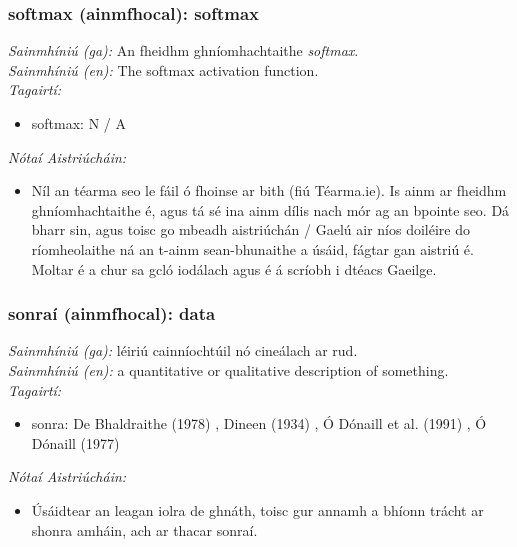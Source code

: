 \subsubsection*{softmax (ainmfhocal): softmax}
 \noindent \textit{Sainmhíniú (ga):} An fheidhm ghníomhachtaithe  \noindent \textit{softmax}.
\\
 \noindent \textit{Sainmhíniú (en):} The softmax activation function.
\\
 \noindent \textit{Tagairtí:}
\begin{itemize}
	\item softmax: N / A
\end{itemize}

 \noindent \textit{Nótaí Aistriúcháin:}
\begin{itemize}
	\item Níl an téarma seo le fáil ó fhoinse ar bith (fiú Téarma.ie). Is ainm ar fheidhm ghníomhachtaithe é, agus tá sé ina ainm dílis nach mór ag an bpointe seo. Dá bharr sin, agus toisc go mbeadh aistriúchán / Gaelú air níos doiléire do ríomheolaithe ná an t-ainm sean-bhunaithe a úsáid, fágtar gan aistriú é. Moltar é a chur sa gcló iodálach agus é á scríobh i dtéacs Gaeilge.
\end{itemize}


\subsubsection*{sonraí (ainmfhocal): data}
 \noindent \textit{Sainmhíniú (ga):} léiriú cainníochtúil nó cineálach ar rud.
\\
 \noindent \textit{Sainmhíniú (en):} a quantitative or qualitative description of something.
\\
 \noindent \textit{Tagairtí:}
\begin{itemize}
	\item sonra: De Bhaldraithe (1978) \cite{de-bhaldraithe}, Dineen (1934) \cite{dineen}, Ó Dónaill et al. (1991) \cite{focloir-beag}, Ó Dónaill (1977) \cite{odonaill}
\end{itemize}

 \noindent \textit{Nótaí Aistriúcháin:}
\begin{itemize}
	\item Úsáidtear an leagan iolra de ghnáth, toisc gur annamh a bhíonn trácht ar shonra amháin, ach ar thacar sonraí.
\end{itemize}


